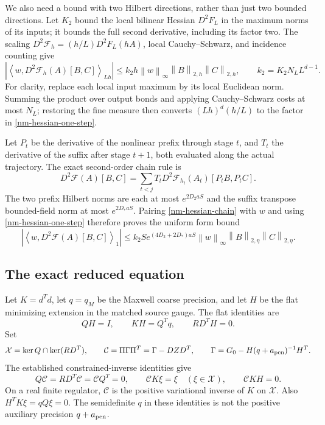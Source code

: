 \documentclass[11pt]{article}
\theoremstyle{remark}
\newcommand{\norm}[1]{\left\|#1\right\|}
\begin{document}
We also need a bound with two Hilbert directions, rather than just
two bounded directions. Let $K_2$ bound the local bilinear Hessian
$D^2F_L$ in the maximum norms of its inputs; it bounds the full
second derivative, including its factor two. The scaling
$D^2\mathcal F_h=(h/L)D^2F_L(hA)$, local Cauchy--Schwarz, and
incidence counting give
\begin{equation}\label{nm-hessian-one-step}
 \left|\left\langle w,D^2\mathcal F_h(A)[B,C]\right\rangle_{Lh}\right|
 \le k_2h\norm{w}_\infty\norm{B}_{2,h}\norm{C}_{2,h},
 \qquad k_2=K_2N_LL^{d-1}.
\end{equation}
For clarity, replace each local input maximum by its local
Euclidean norm. Summing the product over output bonds and applying
Cauchy--Schwarz costs at most $N_L$; restoring the fine measure
then converts $(Lh)^d(h/L)$ to the factor in
\eqref{nm-hessian-one-step}.

Let $P_t$ be the derivative of the nonlinear prefix through stage
$t$, and $T_t$ the derivative of the suffix after stage $t+1$,
both evaluated along the actual trajectory. The exact second-order
chain rule is
\begin{equation}\label{nm-hessian-chain}
 D^2\mathcal F(A)[B,C]
 =\sum_{t<j}T_tD^2\mathcal F_{h_t}(A_t)[P_tB,P_tC].
\end{equation}
The two prefix Hilbert norms are each at most $e^{2D_2aS}$ and the
suffix transpose bounded-field norm at most $e^{2D_*aS}$.
Pairing \eqref{nm-hessian-chain} with $w$ and using
\eqref{nm-hessian-one-step} therefore proves the uniform form bound
\begin{equation}\label{nm-hessian-composite}
 \boxed{\quad
 \left|\left\langle w,D^2\mathcal F(A)[B,C]\right\rangle_1\right|
 \le k_2S e^{(4D_2+2D_*)aS}
       \norm{w}_\infty\norm{B}_{2,\eta}\norm{C}_{2,\eta}.
 \quad}
\end{equation}

\subsection{The exact reduced equation}
\label{nm-reduction}

Let $K=d^Td$, let $q=q_M$ be the Maxwell coarse precision, and let
$H$ be the flat minimizing extension in the matched source gauge.
The flat identities are
\begin{equation}\label{nm-flat-identities}
 QH=I,\qquad KH=Q^Tq,\qquad RD^TH=0.
\end{equation}
Set
\begin{equation}\label{nm-slice-green}
 \mathcal X=\ker Q\cap\ker(RD^T),\qquad
 \mathcal C=\Pi\Gamma\Pi^T=\Gamma-DZD^T,
 \qquad \Gamma=G_0-H(q+a_{\rm pen})^{-1}H^T.
\end{equation}
The established constrained-inverse identities give
\begin{equation}\label{nm-constrained-identities}
 Q\mathcal C=RD^T\mathcal C=\mathcal C Q^T=0,\qquad
 \mathcal C K\xi=\xi\quad(\xi\in\mathcal X),\qquad
 \mathcal C KH=0.
\end{equation}
On a real finite regulator, $\mathcal C$ is the positive
variational inverse of $K$ on $\mathcal X$. Also
$H^TK\xi=qQ\xi=0$. The semidefinite $q$ in these identities is
not the positive auxiliary precision $q+a_{\rm pen}$.
\end{document}
